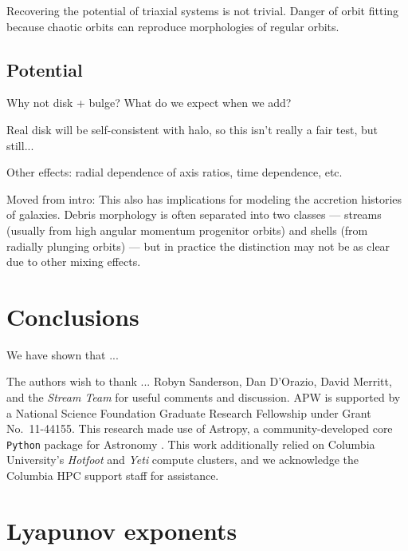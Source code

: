 \documentclass[letterpaper,12pt,preprint]{aastex}
\begin{document}
Recovering the potential of triaxial systems is not trivial. Danger of orbit fitting because chaotic orbits can reproduce morphologies of regular orbits.

\subsection{Potential}

Why not disk + bulge? What do we expect when we add?

Real disk will be self-consistent with halo, so this isn't really a fair test, but still...

Other effects: radial dependence of axis ratios, time dependence, etc.

Moved from intro:
This also has implications for modeling the accretion histories of galaxies. Debris morphology is often separated into two classes --- streams (usually from high angular momentum progenitor orbits) and shells (from radially plunging orbits) --- but in practice the distinction may not be as clear due to other mixing effects.

\section{Conclusions}\label{sec:conclusions}
We have shown that ...

\acknowledgements
The authors wish to thank ... Robyn Sanderson, Dan D'Orazio, David Merritt, and the \emph{Stream Team} for useful comments and discussion.
APW is supported by a National Science Foundation Graduate Research Fellowship under Grant No.\ 11-44155. 
This research made use of Astropy, a community-developed core \texttt{Python} package for Astronomy \citep{astropy13}.
This work additionally relied on Columbia University's \emph{Hotfoot} and \emph{Yeti} compute clusters, and we acknowledge the Columbia HPC support staff for assistance.




\appendix
\section{Lyapunov exponents} \label{sec:lyapapdx}
\end{document}
